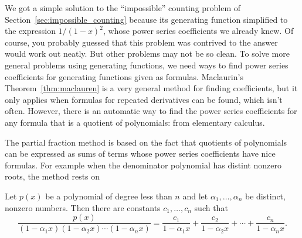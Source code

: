 We got a simple solution to the ``impossible'' counting problem of
Section~\ref{sec:impossible_counting} because its generating function
simplified to the expression $1/(1-x)^2$, whose power series
coefficients we already knew.  Of course, you probably guessed that
this problem was contrived to the answer would work out neatly. But
other problems may not be so clean.  To solve more general problems
using generating functions, we need ways to find power series
coefficients for generating functions given as formulas.  Maclaurin's
Theorem~\ref{thm:maclauren} is a very general method for finding
coefficients, but it only applies when formulas for repeated
derivatives can be found, which isn't often.  However, there is an
automatic way to find the power series coefficients for any formula
that is a quotient of polynomials:  from
elementary calculus.

The partial fraction method is based on the fact that quotients of
polynomials can be expressed as sums of terms whose power series
coefficients have nice formulas.  For example when the denominator
polynomial has distint nonzero roots, the method rests on
\begin{lemma}\label{lem:partial-fraction-distinct-roots}
  Let $p(x)$ be a polynomial of degree less than $n$ and let
  $\alpha_1, \dots, \alpha_n$ be distinct, nonzero numbers.  Then
  there are constants $c_1,\dots,c_n$ such that
\[
\frac{p(x)}{(1-\alpha_1 x)(1-\alpha_2 x)\cdots(1-\alpha_n x)} =
\frac{c_1}{1-\alpha_1 x} + \frac{c_2}{1-\alpha_2 x} + \cdots +
\frac{c_n}{1-\alpha_n x}.
\]
\end{lemma}

